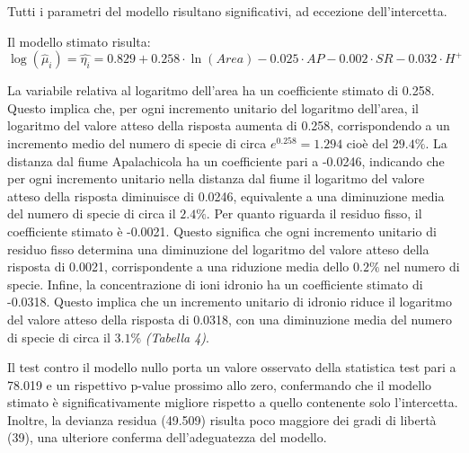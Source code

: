\documentclass{article} %
\begin{document}
Tutti i parametri del modello risultano significativi, ad eccezione dell'intercetta.

Il modello stimato risulta:
\[
\log(\hat{\mu}_i)=\hat{\eta_i}=0.829+0.258 \cdot \ln(Area)-0.025\cdot AP -0.002\cdot SR-0.032\cdot H^+
\]

La variabile relativa al logaritmo dell'area ha un coefficiente stimato di 0.258. Questo implica che, per ogni incremento unitario del logaritmo dell'area, il logaritmo del valore atteso della risposta aumenta di 0.258, corrispondendo a un incremento medio del numero di specie di circa $e^{0.258}=1.294$ cioè del $29.4\%$. 
La distanza dal fiume Apalachicola ha un coefficiente pari a -0.0246, indicando che per ogni incremento unitario nella distanza dal fiume il logaritmo del valore atteso della risposta diminuisce di 0.0246, equivalente a una diminuzione media del numero di specie di circa il $2.4\%$.
Per quanto riguarda il residuo fisso, il coefficiente stimato è -0.0021. Questo significa che ogni incremento unitario di residuo fisso determina una diminuzione del logaritmo del valore atteso della risposta di 0.0021, corrispondente a una riduzione media dello $0.2\%$ nel numero di specie.
Infine, la concentrazione di ioni idronio ha un coefficiente stimato di -0.0318. Questo implica che un incremento unitario di idronio riduce il logaritmo del valore atteso della risposta di 0.0318, con una diminuzione media del numero di specie di circa il $3.1\%$ \textit{(Tabella 4)}.

Il test contro il modello nullo porta un valore osservato della statistica test pari a 78.019 e un rispettivo p-value prossimo allo zero, confermando che il modello stimato è significativamente migliore rispetto a quello contenente solo l'intercetta. Inoltre, la devianza residua (49.509) risulta poco maggiore dei gradi di libertà (39), una ulteriore conferma dell'adeguatezza del modello.
\end{document}
